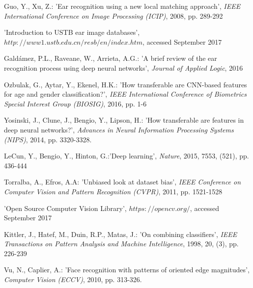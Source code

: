 \documentclass[11pt,journal,compsoc]{IEEEtran}
\begin{document}
\begin{thebibliography}{1}
Guo, Y., Xu, Z.: 'Ear recognition using a new local matching approach', \textit{IEEE International Conference on Image Processing (ICIP)}, 2008, pp. 289-292

'Introduction to USTB ear image databases', $http://www1.ustb.edu.cn/resb/en/index.htm$, accessed September 2017

Gald\'{a}mez, P.L., Raveane, W., Arrieta, A.G.: 'A brief review of the ear recognition process using deep neural networks', \textit{Journal of Applied Logic}, 2016

Ozbulak, G., Aytar, Y., Ekenel, H.K.: 'How transferable are CNN-based features for age and gender classification?', \textit{IEEE International Conference of Biometrics Special Interest Group (BIOSIG)}, 2016, pp. 1-6

Yosinski, J., Clune, J., Bengio, Y., Lipson, H.: 'How transferable are features in deep neural networks?', \textit{Advances in Neural Information Processing Systems (NIPS)}, 2014, pp. 3320-3328.

LeCun, Y., Bengio, Y., Hinton, G.:'Deep learning', \textit{Nature}, 2015, 7553, (521), pp. 436-444

Torralba, A., Efros, A.A: 'Unbiased look at dataset bias', \textit{IEEE Conference on Computer Vision and Pattern Recognition (CVPR)}, 2011, pp. 1521-1528

'Open Source Computer Vision Library', $https://opencv.org/$, accessed September 2017

Kittler, J., Hatef, M., Duin, R.P., Matas, J.: 'On combining classifiers', \textit{IEEE Transactions on Pattern Analysis and Machine Intelligence}, 1998, 20, (3), pp. 226-239

Vu, N., Caplier, A.: 'Face recognition with patterns of oriented edge magnitudes', \textit{Computer Vision (ECCV)}, 2010, pp. 313-326.

\end{thebibliography}
\end{document}

